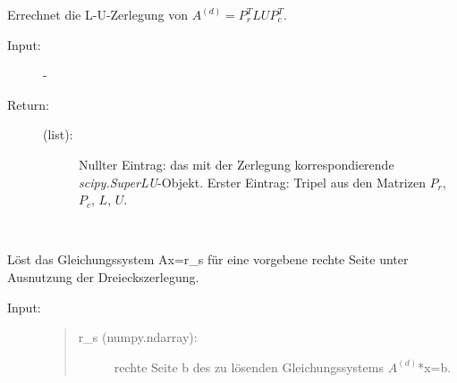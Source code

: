 \documentclass[letterpaper,10pt,ngerman, oneside, openright]{sphinxmanual}
\begin{document}
\begin{fulllineitems}
\begin{fulllineitems}
\begin{description}
\begin{description}
\end{description}

\end{description}

\end{fulllineitems}


\begin{fulllineitems}
\label{\detokenize{index:sparse_erw.Sparse.l_u_zerl}}
Errechnet die L-U-Zerlegung von $A^{(d)}=P_r^TLUP_c^T$.

\begin{description}
\item [{Input:}] -
\end{description}
\begin{description}
\item[{Return:}] \leavevmode\begin{description}
\item[{(list):}] \leavevmode
Nullter Eintrag: das mit der Zerlegung korrespondierende \textit{scipy.SuperLU}-Objekt.
Erster Eintrag: Tripel aus den Matrizen $P_r$, $P_c$, $L$, $U$.

\end{description}

\end{description}

\end{fulllineitems}


\begin{fulllineitems}
\label{\detokenize{index:sparse_erw.Sparse.lgs_lsg}}~%

Löst das Gleichungssystem Ax=r\_s für eine vorgebene rechte Seite unter Ausnutzung der
Dreieckszerlegung.

\begin{description}
\item [{Input:}]

\begin{quote}
\begin{description}
\item[{r\_s (numpy.ndarray):}] \leavevmode
rechte Seite b des zu lösenden Gleichungssystems $A^{(d)}$*x=b.

\end{description}
\end{quote}\end{description}


\end{fulllineitems}
\end{fulllineitems}
\end{document}
